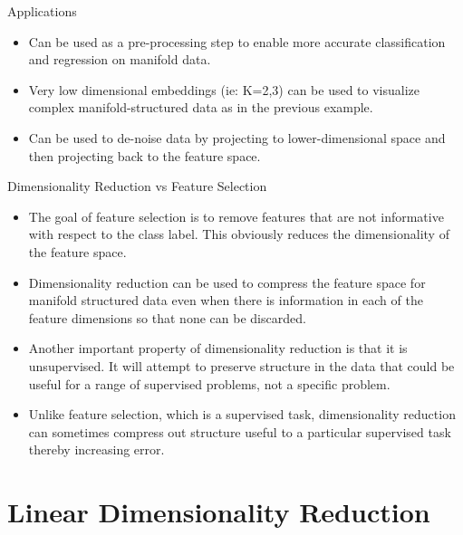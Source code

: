 \documentclass[serif,xcolor=pdftex,dvipsnames,table,hyperref={bookmarks=false,breaklinks}]{beamer}
\begin{document}
\begin{frame}[t]{Applications}
 
\begin{itemize}
\item Can be used as a pre-processing step to enable more accurate
classification and regression on manifold data.

\pause \item Very low dimensional embeddings (ie: K=2,3) can be used to
visualize complex manifold-structured data as in the previous example.

\pause \item Can be used to de-noise data by projecting to lower-dimensional
space and then projecting back to the feature space.

\end{itemize} 
\end{frame}

\begin{frame}[t]{Dimensionality Reduction vs Feature Selection}
 
\begin{itemize}
\item The goal of feature selection is to remove features that are not 
informative with respect to the class label. This obviously reduces the 
dimensionality of the feature space.

\pause\item Dimensionality reduction can be used to compress the feature space
for manifold structured data even when there is information in each of the 
feature dimensions so that none can be discarded.

\pause\item Another important property of dimensionality reduction is that it is 
unsupervised. It will attempt to preserve structure in the data that could be
useful for a range of supervised problems, not a specific problem. 

\pause\item Unlike feature selection, which is a supervised task, 
dimensionality reduction can sometimes compress out structure useful to a 
particular supervised task thereby increasing error.

\end{itemize} 
\end{frame}


\section{Linear Dimensionality Reduction}
\end{document}
